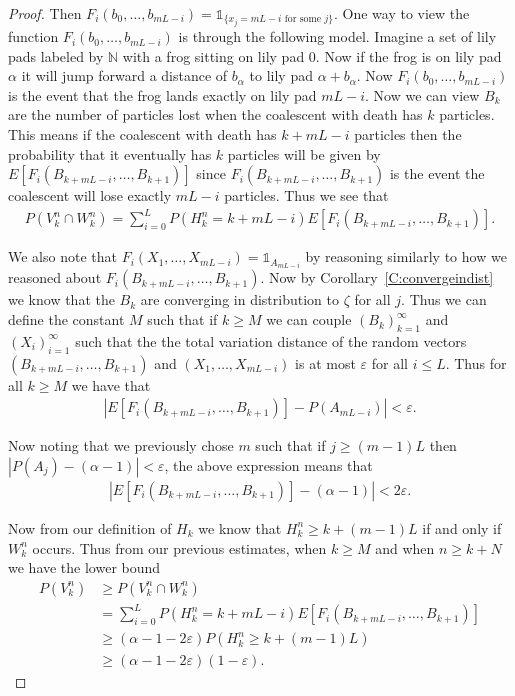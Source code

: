 \documentclass[11pt]{article}
\theoremstyle{definition}
\newcommand{\N}{\mathbb{N}}
\newcommand{\corref}[1]{Corollary~\ref{C:#1}}
\begin{document}
\begin{proof}
    \noindent Then $F_i(b_0, \ldots, b_{mL-i}) = \mathds{1}_{\{x_j = mL-i \text{ for some $j$}\}}$. One way to view the function $F_i(b_0, \ldots, b_{mL-i})$ is through the following model. Imagine a set of lily pads labeled by $\N$ with a frog sitting on lily pad $0$. Now if the frog is on lily pad $\alpha$ it will jump forward a distance of $b_\alpha$ to lily pad $\alpha + b_\alpha$. Now $F_i(b_0, \ldots, b_{mL-i})$ is the event that the frog lands exactly on lily pad $mL-i$. Now we can view $B_k$ are the number of particles lost when the coalescent with death has $k$ particles. This means if the coalescent with death has $k + mL - i$ particles then the probability that it eventually has $k$ particles will be given by $E[F_i(B_{k+mL - i}, \ldots, B_{k+1})]$ since $F_i(B_{k+mL - i}, \ldots, B_{k+1})$ is the event the coalescent will lose exactly $mL-i$ particles. Thus we see that
    \begin{align*}
        P(V_k^n \cap W_k^n) = \sum_{i = 0}^L P(H_k^n = k + mL - i) E[F_i(B_{k+mL - i}, \ldots, B_{k+1})].
    \end{align*}

    \noindent We also note that $F_i(X_1, \ldots, X_{mL - i}) = \mathds{1}_{A_{mL-i}}$ by reasoning similarly to how we reasoned about $F_i(B_{k+mL - i}, \ldots, B_{k+1})$. Now by \corref{convergeindist} we know that the $B_k$ are converging in distribution to $\zeta$ for all $j$. Thus we can define the constant $M$ such that if $k \geq M$ we can couple $(B_k)_{k = 1}^\infty$ and $(X_i)_{i = 1}^\infty$ such that the the total variation distance of the random vectors $(B_{k+mL - i}, \ldots, B_{k+1})$ and $(X_1, \ldots, X_{mL - i})$ is at most $\varepsilon$ for all $i \leq L$. Thus for all $k \geq M$ we have that
    \begin{align*}
        |E[F_i(B_{k+mL - i}, \ldots, B_{k+1})] - P(A_{mL - i})| < \varepsilon.
    \end{align*}

    \noindent Now noting that we previously chose $m$ such that if $j \geq (m-1)L$ then $|P(A_j) - (\alpha -1)| < \varepsilon$, the above expression means that
    \begin{align*}
        |E[F_i(B_{k+mL - i}, \ldots, B_{k+1})] - (\alpha - 1)| < 2\varepsilon.
    \end{align*}

    \noindent Now from our definition of $H_k$ we know that $H_k^n \geq k + (m-1)L$ if and only if $W_k^n$ occurs. Thus from our previous estimates, when $k \geq M$ and when $n \geq k + N$ we have the lower bound
    \begin{align*}
        P(V_k^n) &\geq P(V_k^n \cap W_k^n) \\
        &= \sum_{i = 0}^L P(H_k^n = k + mL - i) E[F_i(B_{k+mL - i}, \ldots, B_{k+1})] \\
        &\geq (\alpha - 1 - 2\varepsilon)P(H_k^n \geq k + (m-1)L)\\
        &\geq (\alpha - 1 - 2\varepsilon)(1-\varepsilon).
    \end{align*}


\end{proof}
\end{document}
